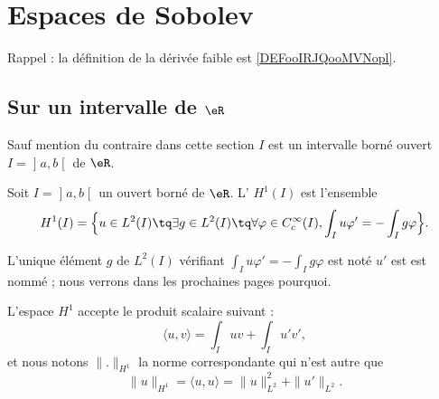 
\section{Espaces de Sobolev}

Rappel : la définition de la dérivée faible est \ref{DEFooIRJQooMVNopl}.

\subsection{Sur un intervalle de \( \eR\)}

Sauf mention du contraire dans cette section \( I\) est un intervalle borné ouvert \( I=\mathopen] a , b \mathclose[\) de \( \eR\).

\begin{definition}
	Soit \( I=\mathopen] a , b \mathclose[\) un ouvert borné de \( \eR\). L' \( H^1(I)\) est l'ensemble
	\begin{equation}
		H^1(I)=\Big\{   u\in L^2(I)\tq\exists g\in L^2(I)\tq\forall \varphi\in  C^{\infty}_c(I),\int_Iu\varphi'=-\int_Ig\varphi   \Big\}.
	\end{equation}
\end{definition}

L'unique élément \( g\) de \( L^2(I)\) vérifiant \( \int_Iu\varphi'=-\int_Ig\varphi\) est noté \( u'\) est est nommé ; nous verrons dans les prochaines pages pourquoi.

L'espace \( H^1\) accepte le produit scalaire suivant :
\begin{equation}
	\langle u, v\rangle =\int_Iuv+\int_Iu'v',
\end{equation}
et nous notons \( \| . \|_{H^1}\) la norme correspondante qui n'est autre que
\begin{equation}
	\| u \|_{H^1}=\langle u, u\rangle =\| u \|^2_{L^2}+\| u' \|_{L^2}.
\end{equation}

